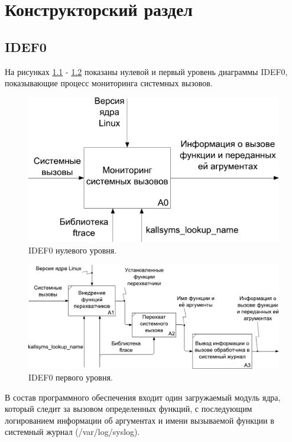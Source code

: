 \chapter{Конструкторский раздел}
    \section{IDEF0}
        На рисунках \ref{idef0:A0} - \ref{idef0:A1} показаны
        нулевой и первый уровень диаграммы IDEF0, показывающие процесс
        мониторинга системных вызовов.
         
    \begin{figure}[h!]
        \centering
        \includegraphics[width = 0.7 \textwidth]{diagrams/src/idef0_A0.pdf}
        \caption{IDEF0 нулевого уровня.}
        \label{idef0:A0}
    \end{figure}

    \begin{figure}[h!]
        \centering
        \includegraphics[width = 0.7 \textwidth]{diagrams/src/idef0_A1.pdf}
        \caption{IDEF0 первого уровня.}
        \label{idef0:A1}
    \end{figure}

        В состав программного обеспечения входит один загружаемый модуль ядра, 
        который следит за вызовом определенных функций, 
        с последующим логированием информации
        об аргументах и имени вызываемой функции в системный журнал (/var/log/syslog).


